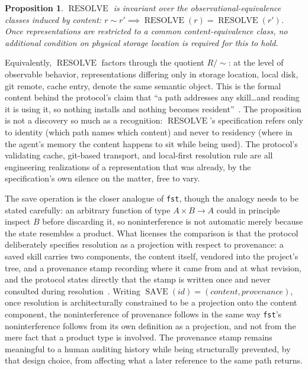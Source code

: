 \documentclass[11pt]{article}
\newtheorem{proposition}{Proposition}
\begin{document}
\begin{proposition}
\label{prop:resolve}
$\operatorname{RESOLVE}$ is invariant over the observational-equivalence classes induced by content: $r \sim r' \implies \operatorname{RESOLVE}(r) = \operatorname{RESOLVE}(r')$. Once representations are restricted to a common content-equivalence class, no additional condition on physical storage location is required for this to hold.
\end{proposition}

Equivalently, $\operatorname{RESOLVE}$ factors through the quotient $R/{\sim}$: at the level of observable behavior, representations differing only in storage location, local disk, git remote, cache entry, denote the same semantic object. This is the formal content behind the protocol's claim that ``a path addresses any skill\ldots and reading it is using it, so nothing installs and nothing becomes resident''~\cite{skills2026}. The proposition is not a discovery so much as a recognition: $\operatorname{RESOLVE}$'s specification refers only to identity (which path names which content) and never to residency (where in the agent's memory the content happens to sit while being used). The protocol's validating cache, git-based transport, and local-first resolution rule are all engineering realizations of a representation that was already, by the specification's own silence on the matter, free to vary.

The save operation is the closer analogue of \texttt{fst}, though the analogy needs to be stated carefully: an arbitrary function of type $A \times B \to A$ could in principle inspect $B$ before discarding it, so noninterference is not automatic merely because the state resembles a product. What licenses the comparison is that the protocol deliberately specifies resolution as a projection with respect to provenance: a saved skill carries two components, the content itself, vendored into the project's tree, and a provenance stamp recording where it came from and at what revision, and the protocol states directly that the stamp is written once and never consulted during resolution~\cite{skills2026}. Writing $\operatorname{SAVE}(id) = (content, provenance)$, once resolution is architecturally constrained to be a projection onto the content component, the noninterference of provenance follows in the same way \texttt{fst}'s noninterference follows from its own definition as a projection, and not from the mere fact that a product type is involved. The provenance stamp remains meaningful to a human auditing history while being structurally prevented, by that design choice, from affecting what a later reference to the same path returns.
\end{document}
